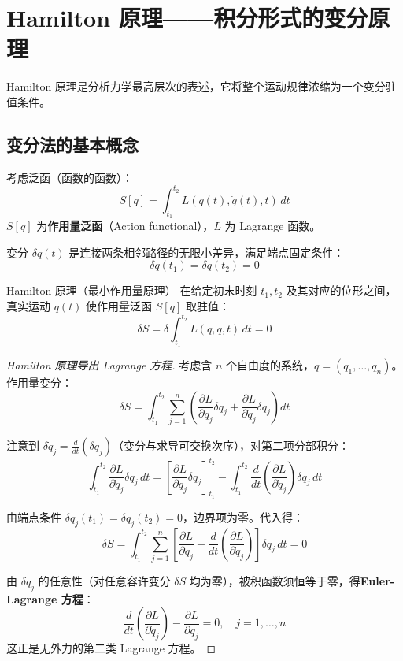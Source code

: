 \section{Hamilton 原理——积分形式的变分原理}

Hamilton 原理是分析力学最高层次的表述，它将整个运动规律浓缩为一个变分驻值条件。

\subsection{变分法的基本概念}

考虑泛函（函数的函数）：
\[
S[q] = \int_{t_1}^{t_2} L(q(t), \dot{q}(t), t) \, dt
\]
$S[q]$ 为\textbf{作用量泛函}（Action functional），$L$ 为 Lagrange 函数。

变分 $\delta q(t)$ 是连接两条相邻路径的无限小差异，满足端点固定条件：
\[
\delta q(t_1) = \delta q(t_2) = 0
\]

\begin{myTheorem}{Hamilton 原理（最小作用量原理）}
	在给定初末时刻 $t_1, t_2$ 及其对应的位形之间，真实运动 $q(t)$ 使作用量泛函 $S[q]$ 取驻值：
	\[
	\delta S = \delta \int_{t_1}^{t_2} L(q, \dot{q}, t) \, dt = 0
	\]
\end{myTheorem}

\begin{proof}[Hamilton 原理导出 Lagrange 方程]
	考虑含 $n$ 个自由度的系统，$q = (q_1, \ldots, q_n)$。作用量变分：
	\[
	\delta S = \int_{t_1}^{t_2} \sum_{j=1}^{n} \left( \frac{\partial L}{\partial q_j} \delta q_j + \frac{\partial L}{\partial \dot{q}_j} \delta \dot{q}_j \right) dt
	\]
	
	注意到 $\delta \dot{q}_j = \frac{d}{dt}(\delta q_j)$（变分与求导可交换次序），对第二项分部积分：
	\[
	\int_{t_1}^{t_2} \frac{\partial L}{\partial \dot{q}_j} \delta \dot{q}_j \, dt = \left[ \frac{\partial L}{\partial \dot{q}_j} \delta q_j \right]_{t_1}^{t_2} - \int_{t_1}^{t_2} \frac{d}{dt} \left( \frac{\partial L}{\partial \dot{q}_j} \right) \delta q_j \, dt
	\]
	
	由端点条件 $\delta q_j(t_1) = \delta q_j(t_2) = 0$，边界项为零。代入得：
	\[
	\delta S = \int_{t_1}^{t_2} \sum_{j=1}^{n} \left[ \frac{\partial L}{\partial q_j} - \frac{d}{dt} \left( \frac{\partial L}{\partial \dot{q}_j} \right) \right] \delta q_j \, dt = 0
	\]
	
	由 $\delta q_j$ 的任意性（对任意容许变分 $\delta S$ 均为零），被积函数须恒等于零，得\textbf{Euler-Lagrange 方程}：
	\[
	\frac{d}{dt} \left( \frac{\partial L}{\partial \dot{q}_j} \right) - \frac{\partial L}{\partial q_j} = 0, \quad j = 1, \ldots, n
	\]
	这正是无外力的第二类 Lagrange 方程。
\end{proof}


